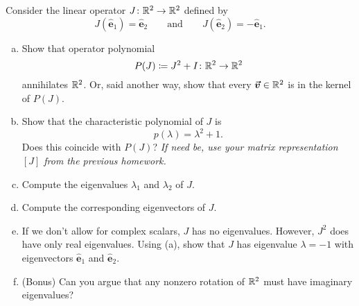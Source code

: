 \documentclass[12pt]{article} %
\newcommand{\ehat}{\boldsymbol{\hat{e}}}
\begin{document}
\newpage
\begin{problem}
Consider the linear operator $J\colon \mathbb{R}^2 \to \mathbb{R}^2$ defined by
\[
J(\ehat_1) = \ehat_2 \qquad \textrm{and} \qquad J(\ehat_2) = -\ehat_1.
\]
\begin{enumerate}[(a)]
    \item Show that operator polynomial
    \[
    P(J) \coloneqq J^2 + I \colon \mathbb{R}^2 \to \mathbb{R}^2
    \]
    annihilates $\mathbb{R}^2$. Or, said another way, show that every $\boldsymbol{\vec{v}} \in \mathbb{R}^2$ is in the kernel of $P(J)$.
    \item Show that the characteristic polynomial of $J$ is
    \[
    p(\lambda) = \lambda^2 + 1.
    \]
    Does this coincide with $P(J)$? \emph{If need be, use your matrix representation $[J]$ from the previous homework.}
    \item Compute the eigenvalues $\lambda_1$ and $\lambda_2$ of $J$.
    \item Compute the corresponding eigenvectors of $J$.
    \item If we don't allow for complex scalars, $J$ has no eigenvalues. However, $J^2$ does have only real eigenvalues. Using (a), show that $J$ has eigenvalue $\lambda=-1$ with eigenvectors $\ehat_1$ and $\ehat_2$.
    \item (Bonus) Can you argue that any nonzero rotation of $\mathbb{R}^2$ must have imaginary eigenvalues?
\end{enumerate}
\end{problem}
\end{document}
